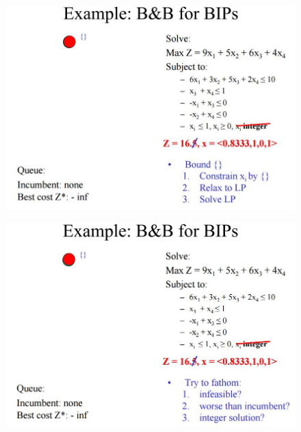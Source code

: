 \documentclass{beamer}
\begin{document}
\begin{frame}
	\begin{figure}
		\centering
		\includegraphics[width=1.0\linewidth]{BB-BIP/BB-BIP3}
	\end{figure}
\end{frame}
\begin{frame}
	\begin{figure}
		\centering
		\includegraphics[width=1.0\linewidth]{BB-BIP/BB-BIP4}
	\end{figure}
\end{frame}
\end{document}
